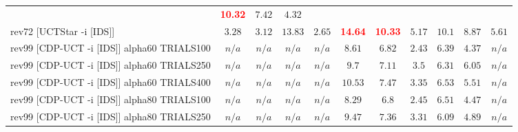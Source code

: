 \documentclass{article}
\begin{document}
\begin{tabular}{|l|r@{$\pm$}rr@{$\pm$}rr@{$\pm$}rr@{$\pm$}rr@{$\pm$}rr@{$\pm$}rr@{$\pm$}rr@{$\pm$}rr@{$\pm$}rr@{$\pm$}r|}
& \multicolumn{2}{c}{\textbf{\textcolor{red}{10.32}}}
& \multicolumn{2}{c}{$7.42$}
& \multicolumn{2}{c|}{$4.32$}
\\
rev72 [UCTStar -i [IDS]]
& \multicolumn{2}{c}{$3.28$}
& \multicolumn{2}{c}{$3.12$}
& \multicolumn{2}{c}{$13.83$}
& \multicolumn{2}{c}{$2.65$}
& \multicolumn{2}{c}{\textbf{\textcolor{red}{14.64}}}
& \multicolumn{2}{c}{\textbf{\textcolor{red}{10.33}}}
& \multicolumn{2}{c}{$5.17$}
& \multicolumn{2}{c}{$10.1$}
& \multicolumn{2}{c}{$8.87$}
& \multicolumn{2}{c|}{$5.61$}
\\
\hline
rev99 [CDP-UCT -i [IDS]] alpha60 TRIALS100
& \multicolumn{2}{c}{\textbf{$n/a$}}
& \multicolumn{2}{c}{\textbf{$n/a$}}
& \multicolumn{2}{c}{\textbf{$n/a$}}
& \multicolumn{2}{c}{\textbf{$n/a$}}
& \multicolumn{2}{c}{$8.61$}
& \multicolumn{2}{c}{$6.82$}
& \multicolumn{2}{c}{$2.43$}
& \multicolumn{2}{c}{$6.39$}
& \multicolumn{2}{c}{$4.37$}
& \multicolumn{2}{c|}{\textbf{$n/a$}}
\\
rev99 [CDP-UCT -i [IDS]] alpha60 TRIALS250
& \multicolumn{2}{c}{\textbf{$n/a$}}
& \multicolumn{2}{c}{\textbf{$n/a$}}
& \multicolumn{2}{c}{\textbf{$n/a$}}
& \multicolumn{2}{c}{\textbf{$n/a$}}
& \multicolumn{2}{c}{$9.7$}
& \multicolumn{2}{c}{$7.11$}
& \multicolumn{2}{c}{$3.5$}
& \multicolumn{2}{c}{$6.31$}
& \multicolumn{2}{c}{$6.05$}
& \multicolumn{2}{c|}{\textbf{$n/a$}}
\\
rev99 [CDP-UCT -i [IDS]] alpha60 TRIALS400
& \multicolumn{2}{c}{\textbf{$n/a$}}
& \multicolumn{2}{c}{\textbf{$n/a$}}
& \multicolumn{2}{c}{\textbf{$n/a$}}
& \multicolumn{2}{c}{\textbf{$n/a$}}
& \multicolumn{2}{c}{$10.53$}
& \multicolumn{2}{c}{$7.47$}
& \multicolumn{2}{c}{$3.35$}
& \multicolumn{2}{c}{$6.53$}
& \multicolumn{2}{c}{$5.51$}
& \multicolumn{2}{c|}{\textbf{$n/a$}}
\\
rev99 [CDP-UCT -i [IDS]] alpha80 TRIALS100
& \multicolumn{2}{c}{\textbf{$n/a$}}
& \multicolumn{2}{c}{\textbf{$n/a$}}
& \multicolumn{2}{c}{\textbf{$n/a$}}
& \multicolumn{2}{c}{\textbf{$n/a$}}
& \multicolumn{2}{c}{$8.29$}
& \multicolumn{2}{c}{$6.8$}
& \multicolumn{2}{c}{$2.45$}
& \multicolumn{2}{c}{$6.51$}
& \multicolumn{2}{c}{$4.47$}
& \multicolumn{2}{c|}{\textbf{$n/a$}}
\\
rev99 [CDP-UCT -i [IDS]] alpha80 TRIALS250
& \multicolumn{2}{c}{\textbf{$n/a$}}
& \multicolumn{2}{c}{\textbf{$n/a$}}
& \multicolumn{2}{c}{\textbf{$n/a$}}
& \multicolumn{2}{c}{\textbf{$n/a$}}
& \multicolumn{2}{c}{$9.47$}
& \multicolumn{2}{c}{$7.36$}
& \multicolumn{2}{c}{$3.31$}
& \multicolumn{2}{c}{$6.09$}
& \multicolumn{2}{c}{$4.89$}
& \multicolumn{2}{c|}{\textbf{$n/a$}}

\end{tabular}
\end{document}
